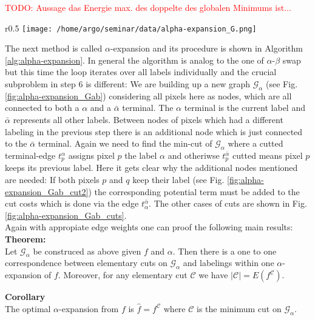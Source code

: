 \documentclass{scrartcl}[12pt, halfparskip]
\newcommand{\todo}[1]{\textcolor{red}{TODO: #1}}
\begin{document}
\todo{Aussage das Energie max. des doppelte des globalen Minimums ist...} \\

\begin{wrapfigure}{r}{0.5\textwidth}
	\vspace{-1.5cm}
	\texttt{[image: /home/argo/seminar/data/alpha-expansion\_G.png]}
	\caption{blubb}
	\label{fig:alpha-expansion_Gab}
\end{wrapfigure}

The next method is called $\alpha$-expansion and its procedure is shown in Algorithm \ref{alg:alpha-expansion}. In general the algorithm is analog to the one of $\alpha$-$\beta$ swap but this time the loop iterates over all labels individually and the crucial subproblem in step 6 is different:
We are building up a new graph $\mathcal{G}_\alpha$ (see Fig. \ref{fig:alpha-expansion_Gab}) considering all pixels here as nodes, which are all connected to both a $\alpha$ and a $\bar{\alpha}$ terminal. 
The $\alpha$ terminal is the current label and $\bar{\alpha}$ represents all other labels. 
Between nodes of pixels which had a different labeling in the previous step there is an additional node which is just connected to the $\bar{\alpha}$ terminal. 
Again we need to find the min-cut of $\mathcal{G}_\alpha$ where a cutted terminal-edge $t_p^\alpha$ assigns pixel $p$ the label $\alpha$ and otheriwse $t_p^{\bar{\alpha}}$ cutted means pixel $p$ keeps its previous label. Here it gets clear why the additional nodes mentioned are needed: If both pixels $p$ and $q$ keep their label (see Fig. \ref{fig:alpha-expansion_Gab_cut2}) the corresponding potential term must be added to the cut costs which is done via the edge $t_\alpha^{\bar{\alpha}}$. The other cases of cuts are shown in Fig. \ref{fig:alpha-expansion_Gab_cuts}. \\

Again with appropiate edge weights one can proof \cite{boykov01} the following main results: \\


\textbf{Theorem:} \\
Let $\mathcal{G}_\alpha$ be construced as above given $f$ and $\alpha$. Then there is a one to one correspondence between elementary cuts on $\mathcal{G}_\alpha$ and labelings within one $\alpha$-expansion of $f$. Moreover, for any elementary cut $\mathcal{C}$ we have $|\mathcal{C}| = E(f^\mathcal{C})$.

\textbf{Corollary} \\
The optimal $\alpha$-expansion from $f$ is $\hat{f} = f^\mathcal{C}$ where $\mathcal{C}$ is the minimum cut on $\mathcal{G}_\alpha$. \\
\end{document}
